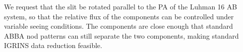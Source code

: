 \documentclass[11pt]{article}
\begin{document}
{{\thepast



%

\technicaldescription


We request that the slit be rotated parallel to the PA of the Luhman 16 AB system, so that the relative flux of the components can be controlled under variable seeing conditions.  The components are close enough that standard ABBA nod patterns can still separate the two components, making standard IGRINS data reduction feasible.



\bandthreeplan




}}
\end{document}
